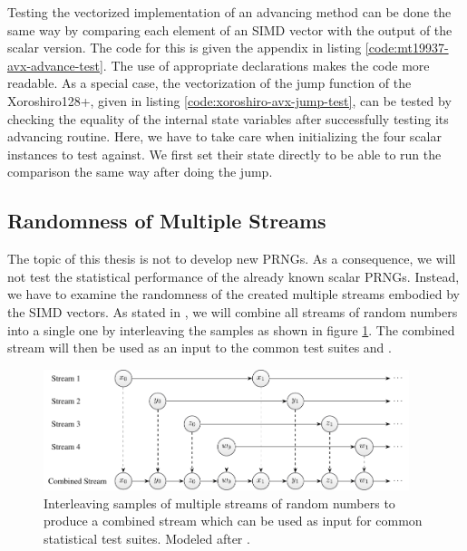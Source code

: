 \documentclass{stdlocal}
\begin{document}
    Testing the vectorized implementation of an advancing method can be done the same way by comparing each element of an SIMD vector with the output of the scalar version.
    The code for this is given the appendix in listing \ref{code:mt19937-avx-advance-test}.
    The use of appropriate  declarations makes the code more readable.
    As a special case, the vectorization of the jump function of the Xoroshiro128+, given in listing \ref{code:xoroshiro-avx-jump-test}, can be tested by checking the equality of the internal state variables after successfully testing its advancing routine.
    Here, we have to take care when initializing the four scalar instances to test against.
    We first set their state directly to be able to run the comparison the same way after doing the jump.


  \subsection{Randomness of Multiple Streams} %
  \label{sub:statistical_testing}
    The topic of this thesis is not to develop new PRNGs.
    As a consequence, we will not test the statistical performance of the already known scalar PRNGs.
    Instead, we have to examine the randomness of the created multiple streams embodied by the SIMD vectors.
    As stated in \textcite[\ppno~160-162]{kneusel2018}, we will combine all streams of random numbers into a single one by interleaving the samples as shown in figure \ref{fig:combined-stream}.
    The combined stream will then be used as an input to the common test suites  and  \autocite{testu01,dieharder}.
    \begin{figure}
      \center
      \includegraphics[width=0.95\textwidth]{figures/interleaving_multiple_streams.pdf}
      \caption[Combined Stream by Interleaving Samples of Multiple Streams]{%
        Interleaving samples of multiple streams of random numbers to produce a combined stream which can be used as input for common statistical test suites.
        Modeled after \textcite[\pno~161]{kneusel2018}.
      }
      \label{fig:combined-stream}
    \end{figure}
\end{document}
